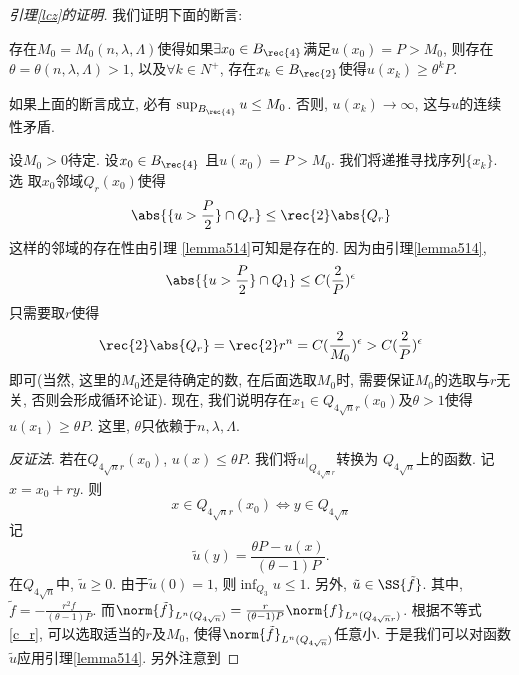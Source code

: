 \begin{proof}[引理\ref{lcz}的证明]
    我们证明下面的断言: 
    \begin{claim*}
        存在$M_0=M_0(n, \lambda, \Lambda)$使得如果$\exists x_0 \in B_\rec{4}$满足$u(x_0)=P > M_0$, 则存在$\theta=\theta(n, \lambda, \Lambda) >1$, 以及$ \forall k \in N^+$, 存在$x_k \in B_{\rec{2}}$使得$u(x_k) \ge \theta^k P$.  
    \end{claim*}
    如果上面的断言成立, 必有 $ \sup_{B_\rec{4}}u \le M_0$.  否则, $u(x_k) \to \infty$, 这与$u$的连续性矛盾.  \par
    设$M_0>0$待定.  设$x_0 \in B_\rec{4}$ 且$u(x_0) = P > M_0$.  我们将递推寻找序列$\{x_k\}$.  选 取$x_0$邻域$Q_r(x_0)$使得
    \begin{equation}\label{c_rrr}
        \abs{\{u > \frac{P}{2}\} \cap Q_r} \le \rec{2}\abs{Q_r}
    \end{equation}
    这样的邻域的存在性由引理 \eqref{lemma514}可知是存在的.  因为由引理\eqref{lemma514}, 
    \begin{equation}
        \abs{\{u > \frac{P}{2}\} \cap Q_1} \le C(\frac{2}{P})^\epsilon
    \end{equation}
    只需要取$r$使得
    \begin{equation}\label{c_r}
        \rec{2}\abs{{Q_r}} = \rec{2}r^n=C(\frac{2}{M_0})^\epsilon>C(\frac{2}{P})^\epsilon
    \end{equation}
    即可(当然, 这里的$M_0$还是待确定的数, 在后面选取$M_0$时, 需要保证$M_0$的选取与$r$无关, 否则会形成循环论证).  现在, 我们说明存在$x_1 \in Q_{4\sqrt{n}r}(x_0)$及$\theta >1$使得$u(x_1)\ge \theta P$.  这里, $\theta$只依赖于$n, \lambda, \Lambda$.  
    \par \textit{反证法}.  若在$Q_{4\sqrt{n}r}(x_0)$, $u(x) \le \theta P$.  我们将$u|_{Q_{4\sqrt{n}r}}$转换为 $Q_{4\sqrt{n}}$上的函数.  记$x=x_0+ry$.  则
    \begin{equation}
        x \in Q_{4\sqrt{n}r}(x_0) \iff  y \in Q_{4\sqrt{n}}
    \end{equation}
    记 
    \begin{equation}
        \tilde{u}(y)=\frac{\theta P-u(x)}{(\theta-1)P} .  
    \end{equation}
    在$Q_{4\sqrt{n}}$中, $\tilde{u} \ge 0$.  由于$\tilde{u}(0)=1$, 则$\inf_{Q_3}u \le 1$.  另外, $\tilde{u} \in \SS{\tilde{f}}$.  其中, $\tilde{f}= -\frac{r^2f}{(\theta-1)P}$.  而$\norm{\tilde{f}}_{L^n(Q_{4\sqrt{n}})}=\frac{r}{(\theta-1)P}\norm{f}_{L^n(Q_{4\sqrt{n}r})}$.  根据不等式\eqref{c_r}, 可以选取适当的$r$及$M_0$, 使得$\norm{\tilde{f}}_{L^n(Q_{4\sqrt{n}})}$任意小.  于是我们可以对函数$\tilde{u}$应用引理\eqref{lemma514}.  另外注意到

\end{proof}
